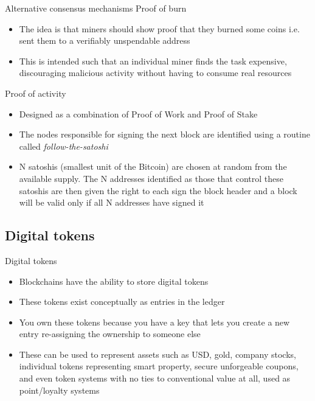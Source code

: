\documentclass[11pt]{beamer}
\begin{document}
\begin{frame}{Alternative consensus mechanisms}
	Proof of burn
	\begin{itemize}
		\item The idea is that miners should show proof that they burned some coins i.e. sent them to a verifiably unspendable address
		\item This is intended such that an individual miner finds the task expensive, discouraging malicious activity without having to consume real resources
	\end{itemize}
	Proof of activity
	\begin{itemize}
		\item Designed as a combination of Proof of Work and Proof of Stake
		\item The nodes responsible for signing the next block are identified using a routine called \textit{follow-the-satoshi}
		\item N satoshis (smallest unit of the Bitcoin) are chosen at random from the available supply. The N addresses identified as those that control these satoshis are then given the right to each sign the block header and a block will be valid only if all N addresses have signed it
	\end{itemize}
\end{frame}


\subsection{Digital tokens}

\begin{frame}{Digital tokens}
	\begin{itemize}
		\item Blockchains have the ability to store digital tokens
		\item These tokens exist conceptually as entries in the ledger
		\item You own these tokens because you have a key that lets you create a new entry re-assigning the ownership to someone else
		\item These can be used to represent assets such as USD, gold, company stocks, individual tokens representing smart property, secure unforgeable coupons, and even token systems with no ties to conventional value at all, used as point/loyalty systems
	\end{itemize}
\end{frame}
\end{document}
